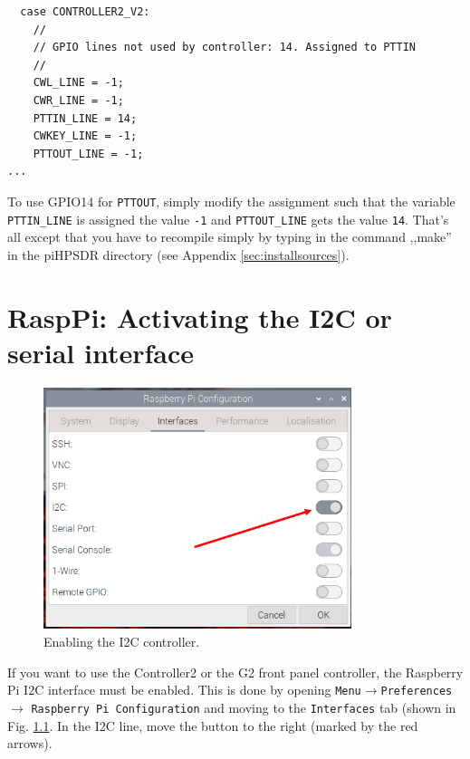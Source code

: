 \documentclass[12pt]{book}
\def\pH{pi\-HPSDR\xspace}
\begin{document}
\begin{small}
\begin{verbatim}
  case CONTROLLER2_V2:
    //
    // GPIO lines not used by controller: 14. Assigned to PTTIN
    //
    CWL_LINE = -1;
    CWR_LINE = -1;
    PTTIN_LINE = 14;
    CWKEY_LINE = -1;
    PTTOUT_LINE = -1;
...
\end{verbatim}
\end{small}

To use GPIO14 for \texttt{PTTOUT}, simply modify the assignment such that the variable
 \texttt{PTTIN\_LINE} is assigned the
value \texttt{-1} and \texttt{PTTOUT\_LINE} gets the value \texttt{14}.
 That's all except that you have to recompile
simply by typing in the command ,,make'' in the \pH directory (see Appendix \ref{sec:installsources}).


\chapter[RaspPi: Activating I2C]{RaspPi: Activating the I2C or serial interface}
\label{sec:i2c}

\begin{figure}[ht]
\center
\includegraphics[width=9cm]{piEnableI2C.png}
\caption{Enabling the I2C controller.}
\label{fig:piEnableI2C}
\end{figure}

If you want to use the Controller2 or the G2 front panel controller, the Raspberry Pi I2C interface
must be enabled. This is done by opening \texttt{Menu}$\to$\texttt{Preferences}$\to$
\texttt{Raspberry Pi Configuration} and moving to the \texttt{Interfaces} tab
(shown in Fig. \ref{fig:piEnableI2C}. In the I2C line, move the button to the right
(marked by the red arrows).
\end{document}
